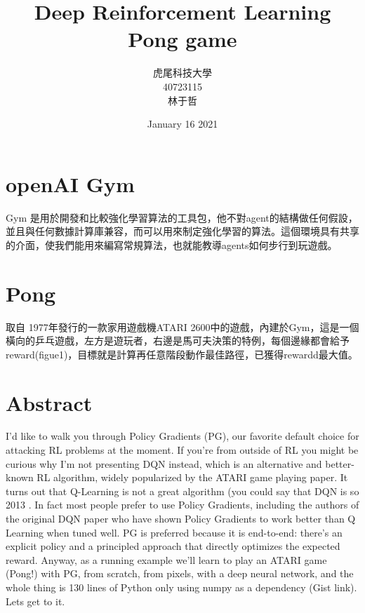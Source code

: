 \documentclass[12pt,a4paper]{article}
\title{Deep Reinforcement Learning Pong game }
\author{虎尾科技大學\\40723115\\ 林于哲}
\date{January 16 2021}
\begin{document}
\maketitle
\tableofcontents



\section{openAI Gym}
Gym 是用於開發和比較強化學習算法的工具包，他不對agent的結構做任何假設，並且與任何數據計算庫兼容，而可以用來制定強化學習的算法。這個環境具有共享的介面，使我們能用來編寫常規算法，也就能教導agents如何步行到玩遊戲。\\[6pt]


\section{Pong}
取自 1977年發行的一款家用遊戲機ATARI 2600中的遊戲，內建於Gym，這是一個橫向的乒乓遊戲，左方是遊玩者，右邊是馬可夫決策的特例，每個邊緣都會給予reward(figue1)，目標就是計算再任意階段動作最佳路徑，已獲得rewardd最大值。
\section{Abstract}
I'd like to walk you through Policy Gradients (PG), our favorite default choice for attacking RL problems at the moment. If you’re from outside of RL you might be curious why I’m not presenting DQN instead, which is an alternative and better-known RL algorithm, widely popularized by the ATARI game playing paper. It turns out that Q-Learning is not a great algorithm (you could say that DQN is so 2013 . In fact most people prefer to use Policy Gradients, including the authors of the original DQN paper who have shown Policy Gradients to work better than Q Learning when tuned well. PG is preferred because it is end-to-end: there's an explicit policy and a principled approach that directly optimizes the expected reward. Anyway, as a running example we'll learn to play an ATARI game (Pong!) with PG, from scratch, from pixels, with a deep neural network, and the whole thing is 130 lines of Python only using numpy as a dependency (Gist link). Lets get to it.
\end{document}

